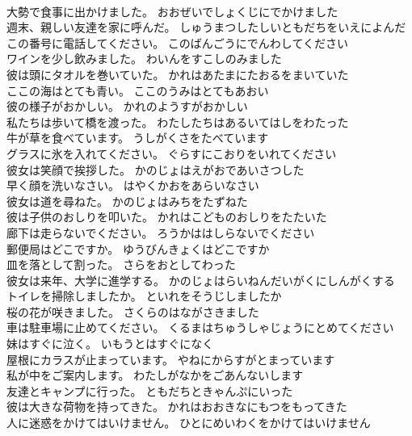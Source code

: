 \documentclass[8pt]{extreport}
\begin{document}
\begin{CJK}{UTF8}{min}
\\	大勢で食事に出かけました。	おおぜいでしょくじにでかけました 
\\	週末、親しい友達を家に呼んだ。	しゅうまつしたしいともだちをいえによんだ 
\\	この番号に電話してください。	このばんごうにでんわしてください 
\\	ワインを少し飲みました。	わいんをすこしのみました 
\\	彼は頭にタオルを巻いていた。	かれはあたまにたおるをまいていた 
\\	ここの海はとても青い。	ここのうみはとてもあおい 
\\	彼の様子がおかしい。	かれのようすがおかしい 
\\	私たちは歩いて橋を渡った。	わたしたちはあるいてはしをわたった 
\\	牛が草を食べています。	うしがくさをたべています 
\\	グラスに氷を入れてください。	ぐらすにこおりをいれてください 
\\	彼女は笑顔で挨拶した。	かのじょはえがおであいさつした 
\\	早く顔を洗いなさい。	はやくかおをあらいなさい 
\\	彼女は道を尋ねた。	かのじょはみちをたずねた 
\\	彼は子供のおしりを叩いた。	かれはこどものおしりをたたいた 
\\	廊下は走らないでください。	ろうかははしらないでください 
\\	郵便局はどこですか。	ゆうびんきょくはどこですか 
\\	皿を落として割った。	さらをおとしてわった 
\\	彼女は来年、大学に進学する。	かのじょはらいねんだいがくにしんがくする 
\\	トイレを掃除しましたか。	といれをそうじしましたか 
\\	桜の花が咲きました。	さくらのはながさきました 
\\	車は駐車場に止めてください。	くるまはちゅうしゃじょうにとめてください 
\\	妹はすぐに泣く。	いもうとはすぐになく 
\\	屋根にカラスが止まっています。	やねにからすがとまっています 
\\	私が中をご案内します。	わたしがなかをごあんないします 
\\	友達とキャンプに行った。	ともだちときゃんぷにいった 
\\	彼は大きな荷物を持ってきた。	かれはおおきなにもつをもってきた 
\\	人に迷惑をかけてはいけません。	ひとにめいわくをかけてはいけません 

\end{CJK}
\end{document}
